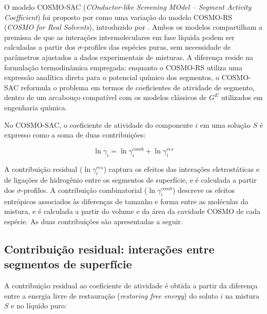 O modelo COSMO-SAC (\textit{COnductor-like Screening MOdel -- Segment Activity Coefficient}) foi proposto por  como uma variação do modelo COSMO-RS (\textit{COSMO for Real Solvents}),  introduzido por . Ambos os modelos compartilham a premissa de que as interações intermoleculares em fase líquida podem ser calculadas a partir dos $\sigma$-profiles das espécies puras, sem necessidade de parâmetros ajustados a dados experimentais de misturas. A diferença reside na formulação termodinâmica empregada: enquanto o COSMO-RS utiliza uma expressão analítica direta para o potencial químico dos segmentos, o COSMO-SAC reformula o problema em termos de coeficientes de atividade de segmento, dentro de um arcabouço compatível com os modelos clássicos de $G^E$ utilizados em engenharia química\cite{lin2002,gerber2010}.


No COSMO-SAC, o coeficiente de atividade do componente $i$ em uma solução $S$ é expresso como a soma de duas contribuições\cite{lin2002}:

\begin{equation}
    \ln \gamma_i = \ln \gamma_i^{comb} + \ln \gamma_i^{res}
    \label{eq:gamma_cosmo}
\end{equation}

A contribuição residual ($\ln \gamma_i^{res}$) captura os efeitos das interações eletrostáticas e de ligações de hidrogênio entre os segmentos de superfície, e é calculada a partir dos $\sigma$-profiles. A contribuição combinatorial ($\ln \gamma_i^{comb}$) descreve os efeitos entrópicos associados às diferenças de tamanho e forma entre as moléculas da mistura, e é calculada a partir do volume e da área da cavidade COSMO de cada espécie. As duas contribuições são apresentadas a seguir.


\subsection{Contribuição residual: interações entre segmentos de
superfície}
\label{subsec:cosmo_residual}

A contribuição residual ao coeficiente de atividade é obtida a partir da diferença entre a energia livre de restauração (\textit{restoring free energy}) do soluto $i$ na mistura $S$ e no líquido puro\cite{lin2002}:

